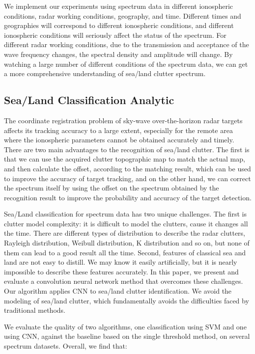 We implement our experiments using spectrum data in different ionospheric conditions, radar working conditions, geography, and time. Different times and geographies will correspond to different ionospheric conditions, and different ionospheric conditions will seriously affect the status of the spectrum. For different radar working conditions, due to the transmission and acceptance of the wave frequency changes, the spectral density and amplitude will change. By watching a large number of different conditions of the spectrum data, we can get a more comprehensive understanding of sea/land clutter spectrum.

\subsection{Sea/Land Classification Analytic}
The coordinate registration problem of sky-wave over-the-horizon radar targets affects its tracking accuracy to a large extent, especially for the remote area where the ionospheric parameters cannot be obtained accurately and timely. There are two main advantages to the recognition of sea/land clutter. The first is that we can use the acquired clutter topographic map to match the actual map, and then calculate the offset, according to the matching result, which can be used to improve the accuracy of target tracking, and on the other hand, we can correct the spectrum itself by using the offset on the spectrum obtained by the recognition result to improve the probability and accuracy of the target detection.

Sea/Land classification for spectrum data has two unique challenges. The first is clutter model complexity: it is difficult to model the clutters, cause it changes all the time. There are different types of distribution to describe the radar clutters, Rayleigh distribution, Weibull distribution, K distribution and so on, but none of them can lead to a good result all the time. Second, features of classical sea and land are not easy to distill. We may know it easily artificially, but it is nearly impossible to describe these features accurately. In this paper, we present and evaluate a convolution neural network method that overcomes these challenges. Our algorithm applies CNN to sea/land clutter identification. We avoid the modeling of sea/land clutter, which fundamentally avoids the difficulties faced by traditional methods.

We evaluate the quality of two algorithms, one classification using SVM and one using CNN, against the baseline based on the single threshold method, on several spectrum datasets. Overall, we find that:

